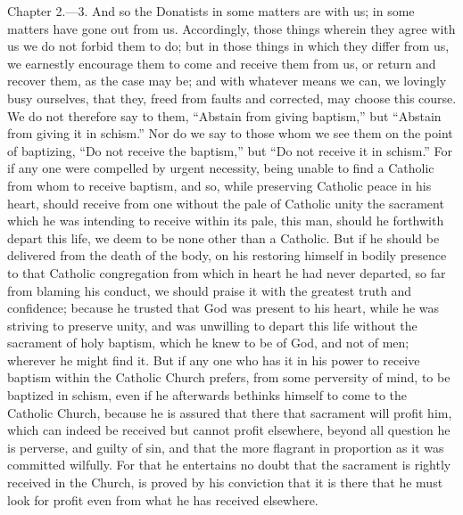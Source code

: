 Chapter 2.—3. And so the Donatists in some matters are with us; in some matters have gone out from us. Accordingly, those things wherein they agree with us we do not forbid them to do; but in those things in which they differ from us, we earnestly encourage them to come and receive them from us, or return and recover them, as the case may be; and with whatever means we can, we lovingly busy ourselves, that they, freed from faults and corrected, may choose this course. We do not therefore say to them, ``Abstain from giving baptism,'' but ``Abstain from giving it in schism.'' Nor do we say to those whom we see them on the point of baptizing, ``Do not receive the baptism,'' but ``Do not receive it in schism.'' For if any one were compelled by urgent necessity, being unable to find a Catholic from whom to receive baptism, and so, while preserving Catholic peace in his heart, should receive from one without the pale of Catholic unity the sacrament which he was intending to receive within its pale, this man, should he forthwith depart this life, we deem to be none other than a Catholic. But if he should be delivered from the death of the body, on his restoring himself in bodily presence to that Catholic congregation from which in heart he had never departed, so far from blaming his conduct, we should praise it with the greatest truth and confidence; because he trusted that God was present to his heart, while he was striving to preserve unity, and was unwilling to depart this life without the sacrament of holy baptism, which he knew to be of God, and not of men; wherever he might find it. But if any one who has it in his power to receive baptism within the Catholic Church prefers, from some perversity of mind, to be baptized in schism, even if he afterwards bethinks himself to come to the Catholic Church, because he is assured that there that sacrament will profit him, which can indeed be received but cannot profit elsewhere, beyond all question he is perverse, and guilty of sin, and that the more flagrant in proportion as it was committed wilfully. For that he entertains no doubt that the sacrament is rightly received in the Church, is proved by his conviction that it is there that he must look for profit even from what he has received elsewhere.


